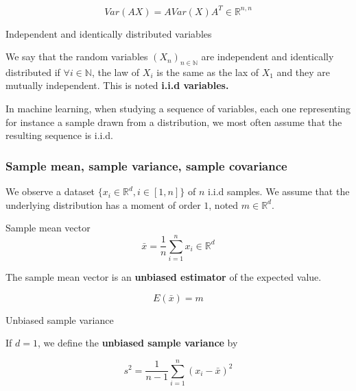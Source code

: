 \documentclass[
10pt, %
a4paper, %
oneside, %
headinclude,footinclude, %
BCOR5mm, %
]{scrartcl}
\begin{document}
\begin{lemma}
    \begin{equation*}
	Var(AX) = AVar(X)A^T\in \mathbb{R}^{n, n}
    \end{equation*}
\end{lemma}

\begin{definition}{Independent and identically distributed variables}

    We say that the random variables $(X_n)_{n\in \mathbb{N} }$ are independent and identically distributed if $\forall i\in \mathbb{N} $, the law of $X_i$ is the same as the lax of $X_1$ and they are mutually independent. This is noted \textbf{{i.i.d variables.}} 
\end{definition}

\begin{remark}
    In machine learning, when studying a sequence of variables, each one representing for instance a sample drawn from a distribution, we most often assume that the resulting sequence is i.i.d.
\end{remark}


\subsubsection{\large\color{Periwinkle}Sample mean, sample variance, sample covariance}
\label{sec:empstats}

We observe a dataset $ \{x_i\in \mathbb{R}^d, i\in [1, n]\}$ of $n$ i.i.d samples. We assume that the underlying distribution has a moment of order $1$, noted $m\in \mathbb{R}^d$.

\begin{definition}{Sample mean vector}
    \begin{equation*}
	\bar{x} = \frac{1}{n} \sum^{n}_{i=1} x_i\in \mathbb{R}^d
    \end{equation*}
\end{definition}

\begin{remark}
The sample mean vector is an \textbf{{unbiased estimator}} of the expected value.

\begin{equation*}
    E( \bar{x}) = m
\end{equation*}
\end{remark}

\begin{definition}{Unbiased sample variance}

    If $d=1$, we define the \textbf{{unbiased sample variance}} by

    \begin{equation*}
	s^2= \frac{1}{n-1}  \sum^{n}_{i=1} (x_i- \bar{x})^2
    \end{equation*}
\end{definition}
\end{document}

